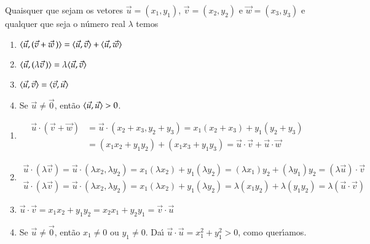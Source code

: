 \begin{proposicao}\label{propriedades-produto-interno}
  Quaisquer que sejam os vetores $\vec{u} = (x_1, y_1)$, $\vec{v} = (x_2, y_2)$ e $\vec{w} = (x_3, y_3)$ e qualquer que seja o n\'umero real $\lambda$ temos
  \begin{enumerate}[label=({\roman*})]
    \item\label{linearidade-produto-interno} $\langle \vec{u}, (\vec{v} + \vec{w}\,)\rangle = \langle \vec{u}, \vec{v} \rangle + \langle \vec{u}, \vec{w} \rangle$
    \item\label{linearidade2-produto-interno} $\langle \vec{u}, (\lambda \vec{v}\,)\rangle = \lambda\langle \vec{u}, \vec{v} \rangle$
    \item $\langle \vec{u}, \vec{v} \rangle = \langle \vec{v}, \vec{u} \rangle$
    \item Se $\vec{u} \ne \vec{0}$, ent\~ao $\langle \vec{u}, \vec{u} \rangle > 0$.
  \end{enumerate}
\end{proposicao}
\begin{prova}
  \begin{enumerate}[label=({\roman*})]
    \item \begin{align*}
      \vec{u}\cdot(\vec{v} + \vec{w}) &= \vec{u}\cdot(x_2 + x_3, y_2 + y_3) = x_1(x_2 + x_3) + y_1(y_2 + y_3) \\ &= (x_1x_2 + y_1y_2) + (x_1x_3 + y_1y_3) = \vec{u}\cdot\vec{v} + \vec{u}\cdot\vec{w}
    \end{align*}
    \item \begin{align*}
      \vec{u}\cdot(\lambda\vec{v}) = \vec{u}\cdot(\lambda x_2, \lambda y_2) = x_1(\lambda x_2) + y_1(\lambda y_2) = (\lambda x_1)y_2 + (\lambda y_1)y_2 = (\lambda\vec{u})\cdot\vec{v}\\
      \vec{u}\cdot(\lambda\vec{v}) = \vec{u}\cdot(\lambda x_2, \lambda y_2) = x_1(\lambda x_2) + y_1(\lambda y_2) = \lambda (x_1y_2) + \lambda (y_1y_2) = \lambda(\vec{u}\cdot\vec{v})
    \end{align*}
    \item $\vec{u}\cdot\vec{v} = x_1x_2 + y_1y_2 = x_2x_1 + y_2y_1 = \vec{v}\cdot\vec{u}$
    \item Se $\vec{u} \ne \vec{0}$, ent\~ao $x_1 \ne 0$ ou $y_1 \ne 0$. Da{\'\i} $\vec{u}\cdot\vec{u} = x_1^2 + y_1^2 > 0$, como quer{\'\i}amos.
  \end{enumerate}
\end{prova}

